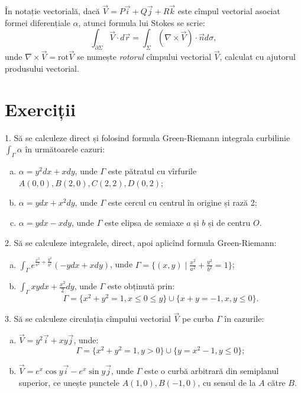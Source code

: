 \documentclass[11pt,a4paper]{article}
\newcommand\ds{\displaystyle}
\theoremstyle{dotless}
\theoremstyle{dotlessdr}
\begin{document}
În notație vectorială, dacă $\vec{V} = P \vec{i} + Q \vec{j} + R \vec{k}$ este cîmpul
vectorial asociat formei diferențiale $\alpha$, atunci formula lui Stokes se scrie:
\[
  \int_{\partial \Sigma} \vec{V} \cdot d\vec{r} = \int_\Sigma (\nabla \times \vec{V}) %
  \cdot \vec{n} d \sigma,
\]
unde $\nabla \times \vec{V} = \mathrm{rot}\vec{V}$ se numește \emph{rotorul} cîmpului
vectorial $\vec{V}$, calculat cu ajutorul produsului vectorial.


\section{Exerciții}
\label{sec:exc-f}

1. Să se calculeze direct și folosind formula Green-Riemann integrala curbilinie
$\int_\Gamma \alpha$ în următoarele cazuri:
\begin{enumerate}[(a)]
\item $\alpha = y^2 dx + xdy$, unde $\Gamma$ este pătratul cu vîrfurile
  $A(0, 0), B(2, 0), C(2,2), D(0, 2)$;
\item $\alpha = ydx + x^2 dy$, unde $\Gamma$ este cercul cu centrul în origine și
  rază 2;
\item $\alpha = ydx - xdy$, unde $\Gamma$ este elipsa de semiaxe $a$ și $b$ și de
  centru $O$.
\end{enumerate}

\vspace{1cm}

2. Să se calculeze integralele, direct, apoi aplicînd formula Green-Riemann:
\begin{enumerate}[(a)]
\item $\ds\int_\Gamma e^{\frac{x^2}{a^2} + \frac{y^2}{b^2}} (-ydx + xdy)$, unde
  $\Gamma = \{(x, y) \mid \frac{x^2}{a^2} + \frac{y^2}{b^2} = 1 \}$;
\item $\ds\int_\Gamma xy dx + \frac{x^2}{2} dy$, unde $\Gamma$ este obținută prin:
  \[
    \Gamma = \{x^2 + y^2 = 1, x \leq 0 \leq y\} \cup \{x + y = -1, x,y \leq 0 \}.
  \]
\end{enumerate}

\vspace{1cm}

3. Să se calculeze circulația cîmpului vectorial $\vec{V}$ pe curba $\Gamma$ în
cazurile:
\begin{enumerate}[(a)]
\item $\vec{V} = y^2 \vec{i} + xy\vec{j}$, unde:
  \[
    \Gamma = \{x^2 + y^2 = 1, y > 0 \} \cup \{ y = x^2 - 1, y \leq 0 \};
  \]
\item $\vec{V} = e^x \cos y \vec{i} - e^x \sin y \vec{j}$, unde $\Gamma$ este
  o curbă arbitrară din semiplanul superior, ce unește punctele $A(1, 0), B(-1, 0)$,
  cu sensul de la $A$ către $B$.
\end{enumerate}
\end{document}
